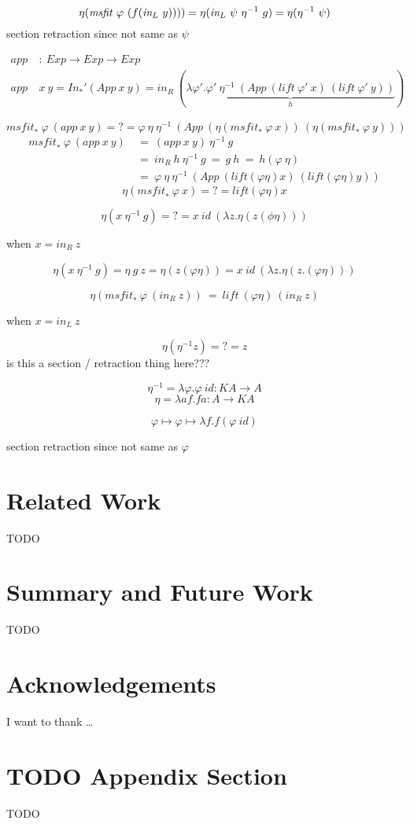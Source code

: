 \documentclass[a4paper,UKenglish]{lipics}
\newcommand{\msfit}[1]{\ensuremath{\textit{msfit}_{#1}}}
\newcommand{\lift}[0]{\textit{lift}}
\newcommand{\In}[1]{\textit{In}_{#1}}
\newcommand{\inL}[0]{\textit{in}_{L}}
\newcommand{\inR}[0]{\textit{in}_{R}}
\begin{document}
\[ \eta(\msfit~\varphi~(f(\inL~y)))) = \eta(\inL~\psi~\eta^{-1}~g)
	= \eta(\eta^{-1}~\psi)
\]
section retraction since not same as $\psi$


\begin{align*}
\textit{app} &~:~ \textit{Exp} \to \textit{Exp} \to \textit{Exp} \\
\textit{app} &~ x~y = \In{*}'(\textit{App}~x~y)
= \inR~(\underbrace{\lambda \varphi'.\varphi'~\eta^{-1}~
			(\textit{App}~(\lift~\varphi'~x)~(\lift~\varphi'~y))}_h)
\end{align*}


\[ \msfit{*}~\varphi~(\textit{app}~x~y)
=?= \varphi~\eta~\eta^{-1}
	~(\textit{App}~(\eta(\msfit{*}~\varphi~x))~(\eta(\msfit{*}~\varphi~y)))
\]
\begin{align*}
\msfit{*}~\varphi~(\textit{app}~x~y)
&~=~ (\textit{app}~x~y)~\eta^{-1}~g \\
&~=~ \inR~h~\eta^{-1}~g ~=~ g~h ~=~ h(\varphi~\eta) \\
&~=~ \varphi~\eta~\eta^{-1}
     ~(\textit{App}~(\lift(\varphi\eta)x)~(\lift(\varphi\eta)y))
\end{align*}
\[ \eta(\msfit{*}~\varphi~x) =?= \lift(\varphi\eta)x \]



\[ \eta(x~\eta^{-1}~g) =?= x~\textit{id}~(\lambda z.\eta(z(\phi\eta))) \]

when $x = \inR~z$

\[
	\eta(x~\eta^{-1}~g) = \eta~g~z = \eta(z(\varphi\eta))
	= x~\textit{id}~(\lambda z.\eta(z.(\varphi\eta)))
\]


\[ \eta(\msfit{*}~\varphi~(\inR~z)) ~=~ \lift~(\varphi\eta)~(\inR~z) \]



when $x = \inL~z$

\[ \eta(\eta^{-1}z) =?= z \]
is this a section / retraction thing here???

\[\eta^{-1} = \lambda \varphi.\varphi~\textit{id} : KA \to A\]
\[ \eta = \lambda a f.f a : A \to KA \]

\[ \varphi \mapsto \varphi \mapsto \lambda f . f(\varphi~\textit{id}) \]

section retraction since not same as $\varphi$

\section{Related Work}
TODO

\section{Summary and Future Work}
TODO

\section*{Acknowledgements}
I want to thank \dots

\appendix
\section{TODO Appendix Section}
TODO


\end{document}
